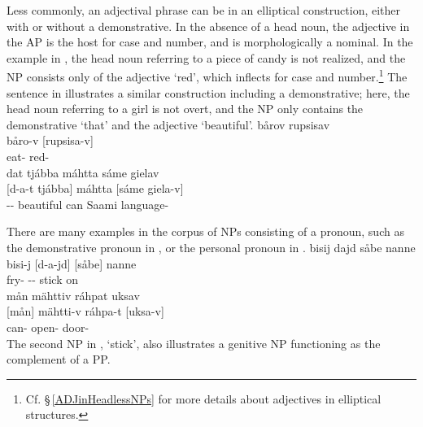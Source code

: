 Less commonly, an adjectival phrase can be in an elliptical construction, either with or without a demonstrative. In the absence of a head noun, the adjective in the AP is the host for case and number, and is morphologically a nominal. In the example in , the head noun referring to a piece of candy is not realized, and the NP consists only of the adjective  ‘red’, which inflects for case and number.\footnote{Cf. §\,\ref{ADJinHeadlessNPs} for more details about adjectives in elliptical structures.} 
The sentence in  illustrates a similar construction including a demonstrative; here, the head noun referring to a girl is not overt, and the NP only contains the demonstrative  ‘that’ and the adjective  ‘beautiful’. 
\ea\label{NPstructureEx8}
\glll	bårov rupsisav\\
	båro-v {[rupsisa-v]\subNP}\\
	eat- red-\\\nopagebreak
{}	
\z
\ea\label{adjNPheadEx3repeat}%
\glll	dat tjábba máhtta sáme gielav\\
	{[d-a-t} {tjábba]\subNP{}} máhtta {[sáme} {giela-v]\subNP{}}\\
	-- beautiful\BS{} can\BS{} Saami\BS{} language-\\\nopagebreak
{}	%
\z

There are many examples in the corpus of NPs consisting of a pronoun, such as the demonstrative pronoun  in , or the personal pronoun  in . %
\ea\label{NPstructureProEx1}
\glll	bisij dajd såbe nanne\\
	bisi-j {[d-a-jd]\subNP{}} {[såbe]\subNP{}} nanne\\
	fry- -- stick\BS{} on\\\nopagebreak
{}	
\z
\ea\label{NPstructureProEx2}
\glll	mån mähttiv ráhpat uksav\\
	{[mån]\subNP{}} mähtti-v ráhpa-t {[uksa-v]\subNP{}}\\
	 can- open- door-\\\nopagebreak
{}	
\z
The second NP in ,  ‘stick’, also illustrates a genitive NP functioning as the complement of a PP. 

